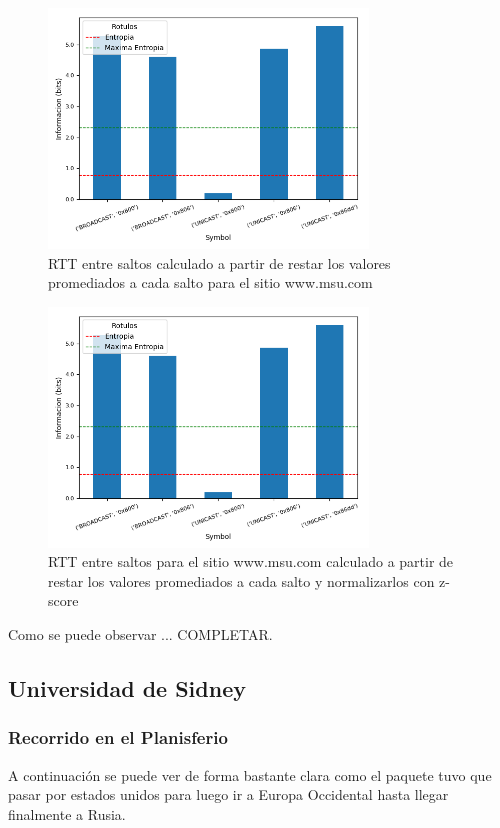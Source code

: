 \begin{figure}[H]
  \centering
  \includegraphics[width=8.5cm]{figs/information_hogar_ethernet_S1_output.png}
  \caption{\normalfont RTT entre saltos calculado a partir de restar los valores promediados a cada salto para el sitio www.msu.com}
\end{figure}

\begin{figure}[H]
  \centering
  \includegraphics[width=8.5cm]{figs/information_hogar_ethernet_S1_output.png}
  \caption{\normalfont RTT entre saltos para el sitio www.msu.com calculado a partir de restar los valores promediados a cada salto y normalizarlos con z-score}
\end{figure}

Como se puede observar ... COMPLETAR.


\subsection*{Universidad de Sidney}

\subsubsection*{Recorrido en el Planisferio}

A continuación se puede ver de forma bastante clara como el paquete tuvo que pasar por estados unidos para luego ir a Europa Occidental hasta llegar finalmente a Rusia.

